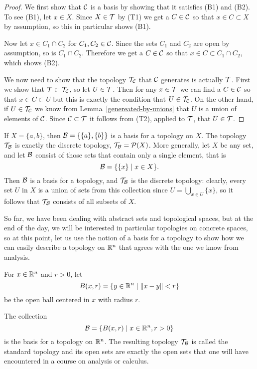 \begin{proof}
  We first show that $\mathcal{C}$ is a basis by showing that it satisfies (B1) and (B2). To see (B1), let $x \in X$. Since $X \in \mathcal{T}$ by (T1) we get a $C \in \mathcal{C}$ so that $x \in C \subset X$ by assumption, so this in particular shows (B1).
  
  Now let $x \in C_1 \cap C_2$ for $C_1,C_2 \in \mathcal{C}$. Since the sets $C_1$ and $C_2$ are open by assumption, so is $C_1 \cap C_2$. Therefore we get a $C \in \mathcal{C}$ so that $x \in C \subset C_1 \cap C_2$, which shows (B2).
  
  We now need to show that the topology $\mathcal{T}_{\mathcal{C}}$ that $\mathcal{C}$ generates is actually $\mathcal{T}$. First we show that $\mathcal{T} \subset \mathcal{T}_{\mathcal{C}}$, so let $U \in \mathcal{T}$. Then for any $x \in \mathcal{T}$ we can find a $C \in \mathcal{C}$ so that $x \in C \subset U$ but this is exactly the condition that $U \in \mathcal{T}_{\mathcal{C}}$. On the other hand, if $U \in \mathcal{T}_{\mathcal{C}}$ we know from Lemma~\ref{genereated-by-unions} that $U$ is a union of elements of $\mathcal{C}$. Since $\mathcal{C} \subset \mathcal{T}$ it follows from (T2), applied to $\mathcal{T}$, that $U \in \mathcal{T}$.
\end{proof}

\begin{example}
  \label{example-discrete-topology}
  If $X = \{a,b\}$, then $\mathcal{B} = \{ \{a\}, \{b\} \}$ is a basis for a topology on $X$. The topology $\mathcal{T}_{\mathcal{B}}$ is exactly the discrete topology, $\mathcal{T}_{\mathcal{B}} = \mathcal{P}(X)$. More generally, let $X$ be any set, and let $\mathcal{B}$ consist of those sets that contain only a single element, that is
  \[
    \mathcal{B} = \{ \{x \} \mid x \in X\}.
  \]
  Then $\mathcal{B}$ is a basis for a topology, and $\mathcal{T}_{\mathcal{B}}$ is the discrete topology: clearly, every set $U$ in $X$ is a union of sets from this collection since $U = \bigcup_{x \in U} \{x\}$, so it follows that $\mathcal{T}_{\mathcal{B}}$ consists of all subsets of $X$.
\end{example}

So far, we have been dealing with abstract sets and topological spaces, but at the end of the day, we will be interested in particular topologies on concrete spaces, so at this point, let us use the notion of a basis for a topology to show how we can easily describe a topology on $\mathbb{R}^n$ that agrees with the one we know from analysis.

For $x \in \mathbb{R}^n$ and $r > 0$, let
\[
  B(x,r) = \{ y \in \mathbb{R}^n \mid \lVert x-y \rVert < r \}
\]
be the open ball centered in $x$ with radius $r$.

\begin{prop}
  \label{basis-euclidean}
  The collection
  \[
    \mathcal{B} = \{ B(x,r) \mid x \in \mathbb{R}^n, r > 0 \}
  \]
  is the basis for a topology on $\mathbb{R}^n$. The resulting topology $\mathcal{T}_{\mathcal{B}}$ is called the standard topology and its open sets are exactly the open sets that one will have encountered in a course on analysis or calculus.
\end{prop}

